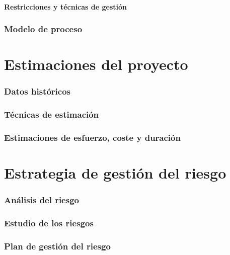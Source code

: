 \documentclass[spanish,a4paper,12pt]{report}	%
\begin{document}
		\subsection{Restricciones y técnicas de gestión}

	\section{Modelo de proceso}

\newpage
\mbox{}
\thispagestyle{empty}						%
\newpage
\setcounter{section}{0}

\part{Estimaciones del proyecto}

	\section{Datos históricos}

	\section{Técnicas de estimación}

	\section{Estimaciones de esfuerzo, coste y duración}

\newpage
\mbox{}
\thispagestyle{empty}						%
\newpage
\setcounter{section}{0}

\part{Estrategia de gestión del riesgo}

	\section{Análisis del riesgo}

	\section{Estudio de los riesgos}

	\section{Plan de gestión del riesgo}
\end{document}
